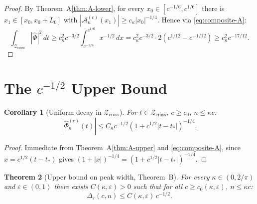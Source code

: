 \documentclass[12pt,a4paper]{amsart}
\newtheorem{theorem}{Theorem}[section]
\newtheorem{corollary}[theorem]{Corollary}
\theoremstyle{definition}
\theoremstyle{remark}
\newcommand{\Zcross}{\mathcal{Z}_{\mathrm{cross}}}
\newcommand{\tstar}{t_*}
\begin{document}
\begin{proof}
By Theorem~A\eqref{thm:A-lower},
for every $x_0 \in [c^{-1/6},c^{1/6}]$
there is $x_1 \in [x_0,x_0+L_0]$ with
$|\mathcal{A}_n^{(c)}(x_1)| \ge c_\kappa|x_0|^{-1/4}$.
Hence via \eqref{eq:composite-A}:
\[
\int_{\Zcross}|\widehat{\Phi}|^2\,dt
\ge c_\kappa^2 c^{-3/2}
\int_{c^{-1/6}}^{c^{1/6}} x^{-1/2}\,dx
= c_\kappa^2 c^{-3/2}\cdot 2(c^{1/12}-c^{-1/12})
\ge c_\kappa^2 c^{-17/12}.
\]
\end{proof}

\section{The $c^{-1/2}$ Upper Bound}
\label{sec:upper}

\begin{corollary}[Uniform decay in $\Zcross$]
\label{cor:uniform-decay}
For $t \in \Zcross$, $c \ge c_0$, $n \le \kappa c$:
\begin{equation}
\label{eq:uniform-decay}
|\widehat{\Phi}_n^{(c)}(t)|
\le C_\kappa c^{-1/2}(1+c^{1/2}|t-\tstar|)^{-1/4}.
\end{equation}
\end{corollary}

\begin{proof}
Immediate from Theorem~A\eqref{thm:A-upper}
and \eqref{eq:composite-A},
since $x = c^{1/2}(t-\tstar)$ gives
$(1+|x|)^{-1/4} = (1+c^{1/2}|t-\tstar|)^{-1/4}$.
\end{proof}

\begin{theorem}[Upper bound on peak width, Theorem~B]
\label{thm:B}
For every $\kappa\in(0,2/\pi)$ and $\varepsilon\in(0,1)$
there exists $C(\kappa,\varepsilon)>0$ such that
for all $c \ge c_0(\kappa,\varepsilon)$, $n \le \kappa c$:
\begin{equation}
\label{eq:thm-B}
\Delta_\varepsilon(c,n) \le C(\kappa,\varepsilon)\,c^{-1/2}.
\end{equation}
\end{theorem}
\end{document}
